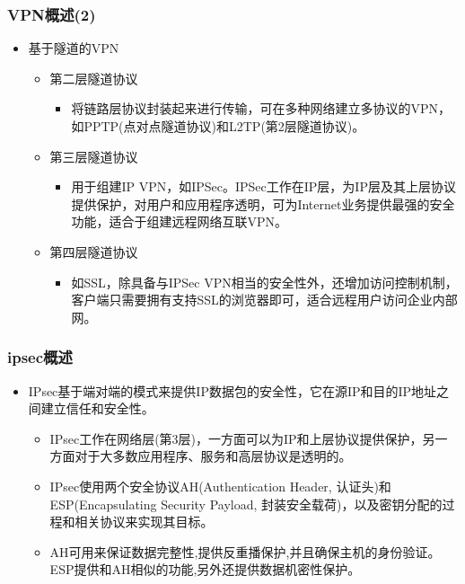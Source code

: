 \documentclass[xcolor=svgnames,presentation]{beamer}
\begin{document}
\begin{frame}
\frametitle{VPN概述(2)}
\label{sec-4-2}
\begin{itemize}

\item 基于隧道的VPN
\label{sec-4-2-1}%
\begin{itemize}

\item 第二层隧道协议
\label{sec-4-2-1-1}%
\begin{itemize}

\item 将链路层协议封装起来进行传输，可在多种网络建立多协议的VPN，如PPTP(点对点隧道协议)和L2TP(第2层隧道协议)。
\label{sec-4-2-1-1-1}%
\end{itemize} %

\item 第三层隧道协议
\label{sec-4-2-1-2}%
\begin{itemize}

\item 用于组建IP VPN，如IPSec。IPSec工作在IP层，为IP层及其上层协议提供保护，对用户和应用程序透明，可为Internet业务提供最强的安全功能，适合于组建远程网络互联VPN。
\label{sec-4-2-1-2-1}%
\end{itemize} %

\item 第四层隧道协议
\label{sec-4-2-1-3}%
\begin{itemize}

\item 如SSL，除具备与IPSec VPN相当的安全性外，还增加访问控制机制，客户端只需要拥有支持SSL的浏览器即可，适合远程用户访问企业内部网。
\label{sec-4-2-1-3-1}%
\end{itemize} %
\end{itemize} %
\end{itemize} %
\end{frame}
\begin{frame}
\frametitle{ipsec概述}
\label{sec-4-3}
\begin{itemize}

\item IPsec基于端对端的模式来提供IP数据包的安全性，它在源IP和目的IP地址之间建立信任和安全性。
\label{sec-4-3-1}%
\begin{itemize}

\item IPsec工作在网络层(第3层)，一方面可以为IP和上层协议提供保护，另一方面对于大多数应用程序、服务和高层协议是透明的。
\label{sec-4-3-1-1}%

\item IPsec使用两个安全协议AH(Authentication Header, 认证头)和ESP(Encapsulating Security Payload, 封装安全载荷)，以及密钥分配的过程和相关协议来实现其目标。
\label{sec-4-3-1-2}%

\item AH可用来保证数据完整性,提供反重播保护,并且确保主机的身份验证。ESP提供和AH相似的功能,另外还提供数据机密性保护。
\label{sec-4-3-1-3}%
\end{itemize} %
\end{itemize} %
\end{frame}
\end{document}
